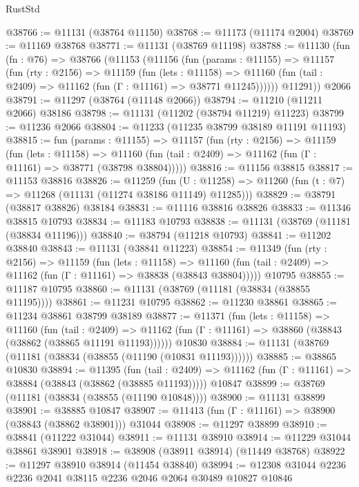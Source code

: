 \begin{lexlean}{RustStd}
\begin{coremodule}
@38766 := @11131 (@38764 @11150)
@38768 := @11173 (@11174 @2004)
@38769 := @11169 @38768
@38771 := @11131 (@38769 @11198)
@38788 := @11130
    (fun (fn : @76) =>
    @38766
      (@11153
        (@11156
          (fun (params : @11155) =>
          @11157
            (fun (rty : @2156) =>
            @11159
              (fun (lets : @11158) =>
              @11160 (fun (tail : @2409) => @11162 (fun (Γ : @11161) => @38771 @11245))))))
        @11291))
    @2066
@38791 := @11297 (@38764 (@11148 @2066))
@38794 := @11210 (@11211 @2066) @38186
@38798 := @11131 (@11202 (@38794 @11219) @11223)
@38799 := @11236 @2066
@38804 := @11233 (@11235 @38799 @38189 @11191 @11193)
@38815 := fun (params : @11155) =>
  @11157
    (fun (rty : @2156) =>
    @11159
      (fun (lets : @11158) =>
      @11160 (fun (tail : @2409) => @11162 (fun (Γ : @11161) => @38771 (@38798 @38804)))))
@38816 := @11156 @38815
@38817 := @11153 @38816
@38826 := @11259
    (fun (U : @11258) => @11260 (fun (t : @7) => @11268 (@11131 (@11274 @38186 @11149) @11285)))
@38829 := @38791 (@38817 @38826) @38184
@38831 := @11116 @38816 @38826
@38833 := @11346 @38815 @10793
@38834 := @11183 @10793
@38838 := @11131 (@38769 (@11181 (@38834 @11196)))
@38840 := @38794 (@11218 @10793)
@38841 := @11202 @38840
@38843 := @11131 (@38841 @11223)
@38854 := @11349
    (fun (rty : @2156) =>
    @11159
      (fun (lets : @11158) =>
      @11160 (fun (tail : @2409) => @11162 (fun (Γ : @11161) => @38838 (@38843 @38804)))))
    @10795
@38855 := @11187 @10795
@38860 := @11131 (@38769 (@11181 (@38834 (@38855 @11195))))
@38861 := @11231 @10795
@38862 := @11230 @38861
@38865 := @11234 @38861 @38799 @38189
@38877 := @11371
    (fun (lets : @11158) =>
    @11160
      (fun (tail : @2409) =>
      @11162 (fun (Γ : @11161) => @38860 (@38843 (@38862 (@38865 @11191 @11193))))))
    @10830
@38884 := @11131 (@38769 (@11181 (@38834 (@38855 (@11190 (@10831 @11193))))))
@38885 := @38865 @10830
@38894 := @11395
    (fun (tail : @2409) => @11162 (fun (Γ : @11161) => @38884 (@38843 (@38862 (@38885 @11193)))))
    @10847
@38899 := @38769 (@11181 (@38834 (@38855 (@11190 @10848))))
@38900 := @11131 @38899
@38901 := @38885 @10847
@38907 := @11413 (fun (Γ : @11161) => @38900 (@38843 (@38862 @38901))) @31044
@38908 := @11297 @38899
@38910 := @38841 (@11222 @31044)
@38911 := @11131 @38910
@38914 := @11229 @31044 @38861 @38901
@38918 := @38908 (@38911 @38914) (@11449 @38768)
@38922 := @11297 @38910 @38914 (@11454 @38840)
@38994 := @12308
    @31044
    @2236
    @2236
    @2041
    @38115
    @2236
    @2046
    @2064
    @30489
    @10827
    @10846

\end{coremodule}
\end{lexlean}
